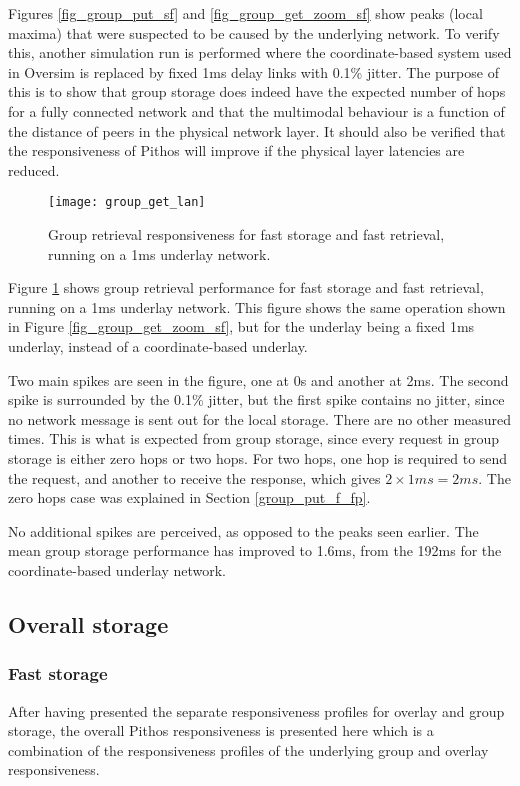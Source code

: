 Figures \ref{fig_group_put_sf} and \ref{fig_group_get_zoom_sf} show peaks (local maxima) that were suspected to be caused by the underlying network. To verify this, another simulation run is performed where the coordinate-based system used in Oversim is replaced by fixed 1ms delay links with 0.1\% jitter. The purpose of this is to show that group storage does indeed have the expected number of hops for a fully connected network and that the multimodal behaviour is a function of the distance of peers in the physical network layer. It should also be verified that the responsiveness of Pithos will improve if the physical layer latencies are reduced.

\begin{figure}[htbp]
 \centering
 \texttt{[image: group\_get\_lan]}
 \caption{Group retrieval responsiveness for fast storage and fast retrieval, running on a 1ms underlay network.}
 \label{fig_group_get_lan}
\end{figure}
%
Figure \ref{fig_group_get_lan} shows group retrieval performance for fast storage and fast retrieval, running on a 1ms underlay network. This figure shows the same operation shown in Figure \ref{fig_group_get_zoom_sf}, but for the underlay being a fixed 1ms underlay, instead of a coordinate-based underlay.

Two main spikes are seen in the figure, one at 0s and another at 2ms. The second spike is surrounded by the 0.1\% jitter, but the first spike contains no jitter, since no network message is sent out for the local storage. There are no other measured times. This is what is expected from group storage, since every request in group storage is either zero hops or two hops. For two hops, one hop is required to send the request, and another to receive the response, which gives $2\times 1 ms = 2 ms$. The zero hops case was explained in Section \ref{group_put_f_fp}.

No additional spikes are perceived, as opposed to the peaks seen earlier. The mean group storage performance has improved to 1.6ms, from the 192ms for the coordinate-based underlay network.

\subsection{Overall storage}

\subsubsection{Fast storage}
After having presented the separate responsiveness profiles for overlay and group storage, the overall Pithos responsiveness is presented here which is a combination of the responsiveness profiles of the underlying group and overlay responsiveness.

